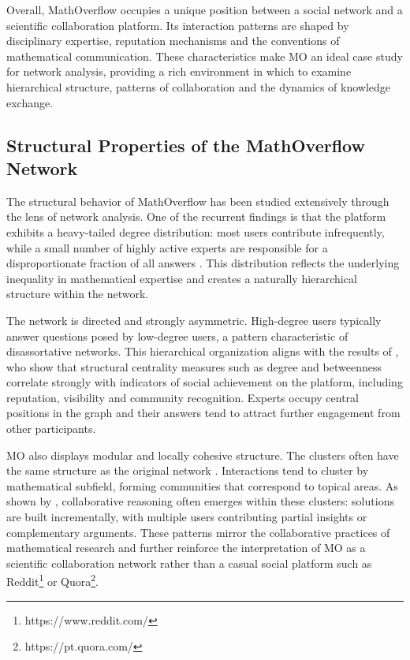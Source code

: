 \documentclass[sigplan]{acmart}
\begin{document}
        Overall, MathOverflow occupies a unique position between a social network and a scientific collaboration platform. Its interaction patterns are shaped by disciplinary expertise, reputation mechanisms and the conventions of mathematical communication. These characteristics make MO an ideal case study for network analysis, providing a rich environment in which to examine hierarchical structure, patterns of collaboration and the dynamics of knowledge exchange.

    \subsection{Structural Properties of the MathOverflow Network}
        The structural behavior of MathOverflow has been studied extensively through
        the lens of network analysis. One of the recurrent findings is that the
        platform exhibits a heavy-tailed degree distribution: most users contribute
        infrequently, while a small number of highly active experts are responsible for
        a disproportionate fraction of all answers \cite{participation2013}. This
        distribution reflects the underlying inequality in mathematical expertise and
        creates a naturally hierarchical structure within the network.
        
        The network is directed and strongly asymmetric. High-degree users typically
        answer questions posed by low-degree users, a pattern characteristic of
        disassortative networks. This hierarchical organization aligns with the results
        of \cite{socialachievement2015}, who show that structural centrality measures
        such as degree and betweenness correlate strongly with indicators of social
        achievement on the platform, including reputation, visibility and community
        recognition. Experts occupy central positions in the graph and their answers
        tend to attract further engagement from other participants.
        
        MO also displays modular and locally cohesive structure. The clusters often have the same structure as the original network \cite{socialachievement2015}. Interactions
        tend to cluster by mathematical subfield, forming communities that correspond
        to topical areas. As shown by \citeauthor{collaborative2012}\cite{collaborative2012}, collaborative reasoning
        often emerges within these clusters: solutions are built incrementally, with
        multiple users contributing partial insights or complementary arguments. These
        patterns mirror the collaborative practices of mathematical research and further
        reinforce the interpretation of MO as a scientific collaboration
        network rather than a casual social platform such as Reddit\footnote{https://www.reddit.com/} or Quora\footnote{https://pt.quora.com/}.
        
\end{document}

